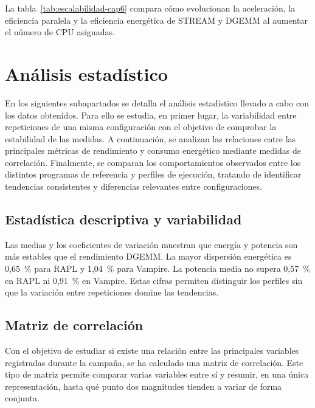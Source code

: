 La tabla~\ref{tab:escalabilidad-cap6} compara cómo evolucionan la aceleración, la eficiencia paralela y la eficiencia energética de STREAM y DGEMM al aumentar el número de CPU asignadas.

\begin{table}[htbp]
    \centering
    \caption{Indicadores de escalabilidad y eficiencia energética para STREAM y DGEMM.}
    \label{tab:escalabilidad-cap6}
    \resizebox{\textwidth}{!}{}
\end{table}

\section{Análisis estadístico}
\label{sec:estadistica-cap6}
En los siguientes subapartados se detalla el análisis estadístico llevado a cabo con los datos obtenidos.  Para ello se estudia, en primer lugar, la variabilidad entre repeticiones de una misma configuración con el objetivo de comprobar la estabilidad de las medidas. A continuación, se analizan las relaciones entre las principales métricas de rendimiento y consumo energético mediante medidas de correlación. Finalmente, se comparan los comportamientos observados entre los distintos programas de referencia y perfiles de ejecución, tratando de identificar tendencias consistentes y diferencias relevantes entre configuraciones.

\subsection{Estadística descriptiva y variabilidad}

Las medias y los coeficientes de variación muestran que energía y potencia son más estables que el rendimiento DGEMM. La mayor dispersión energética es 0,65~\% para RAPL y 1,04~\% para Vampire. La potencia media no supera 0,57~\% en RAPL ni 0,91~\% en Vampire. Estas cifras permiten distinguir los perfiles sin que la variación entre repeticiones domine las tendencias.

\subsection{Matriz de correlación}

Con el objetivo de estudiar si existe una relación entre las principales variables registradas durante la campaña, se ha calculado una matriz de correlación. Este tipo de matriz permite comparar varias variables entre sí y resumir, en una única representación, hasta qué punto dos magnitudes tienden a variar de forma conjunta.

